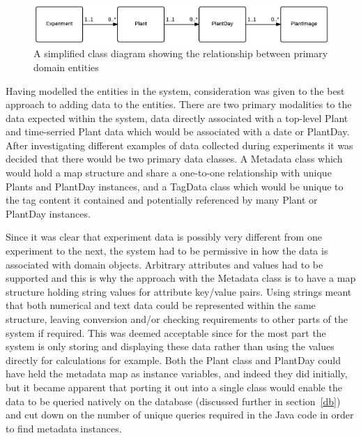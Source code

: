 \begin{figure}[H]
    \centering
    \includegraphics[width=\textwidth]{images/design/domain1}
    \caption{A simplified class diagram showing the relationship between primary domain entities}
    \label{fig:domain1}
\end{figure}


Having modelled the entities in the system, consideration was given to the best approach to adding data to the entities. There are two primary modalities to the data expected within the system, data directly associated with a top-level Plant and time-serried Plant data which would be associated with a date or PlantDay. After investigating different examples of data collected during experiments it was decided that there would be two primary data classes. A Metadata class which would hold a map structure and share a one-to-one relationship with unique Plants and PlantDay instances, and a TagData class which would be unique to the tag content it contained and potentially referenced by many Plant or PlantDay instances.

Since it was clear that experiment data is possibly very different from one experiment to the next, the system had to be permissive in how the data is associated with domain objects. Arbitrary attributes and values had to be supported and this is why the approach with the Metadata class is to have a map structure holding string values for attribute key/value pairs. Using strings meant that both numerical and text data could be represented within the same structure, leaving conversion and/or checking requirements to other parts of the system if required. This was deemed acceptable since for the most part the system is only storing and displaying these data rather than using the values directly for calculations for example. Both the Plant class and PlantDay could have held the metadata map as instance variables, and indeed they did initially, but it became apparent that porting it out into a single class would enable the data to be queried natively on the database (discussed further in section~\ref{db}) and cut down on the number of unique queries required in the Java code in order to find metadata instances.

